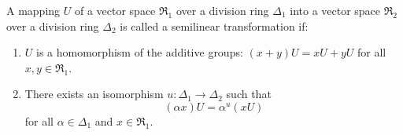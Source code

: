 A mapping $U$ of a vector space $\mathfrak{R}_1$ over a division ring $\Delta_1$ into a vector space $\mathfrak{R}_2$ over a division ring $\Delta_2$ is called a semilinear transformation if:
\begin{enumerate}
\item $U$ is a homomorphism of the additive groups: $(x + y)U = xU + yU$ for all $x, y \in \mathfrak{R}_1$.
\item There exists an isomorphism $u: \Delta_1 \to \Delta_2$ such that
$$(\alpha x)U = \alpha^u (xU)$$
for all $\alpha \in \Delta_1$ and $x \in \mathfrak{R}_1$.
\end{enumerate}
